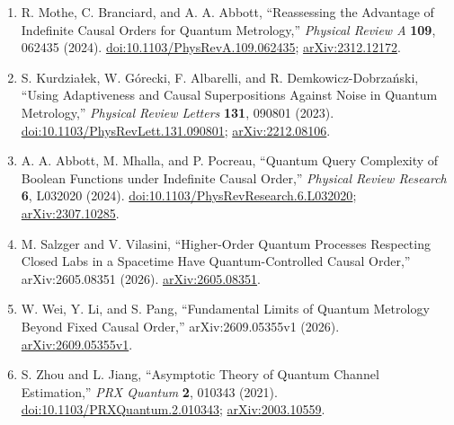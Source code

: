 \begin{enumerate}[label={},leftmargin=4.8em,labelsep=0.5em]
  \footnotesize
  \item[\textup{[MBA24]}]\label{ref:p61-mothe}
  R. Mothe, C. Branciard, and A. A. Abbott,
  ``Reassessing the Advantage of Indefinite Causal Orders for Quantum
  Metrology,'' \emph{Physical Review A} \textbf{109}, 062435 (2024).
  \href{https://doi.org/10.1103/PhysRevA.109.062435}{doi:10.1103/PhysRevA.109.062435};
  \href{https://arxiv.org/abs/2312.12172}{arXiv:2312.12172}.

  \item[\textup{[KGAD23]}]\label{ref:p61-kurdzialek}
  S. Kurdzia\l ek, W. G\'orecki, F. Albarelli, and
  R. Demkowicz-Dobrza\'nski,
  ``Using Adaptiveness and Causal Superpositions Against Noise in Quantum
  Metrology,'' \emph{Physical Review Letters} \textbf{131}, 090801 (2023).
  \href{https://doi.org/10.1103/PhysRevLett.131.090801}{doi:10.1103/PhysRevLett.131.090801};
  \href{https://arxiv.org/abs/2212.08106}{arXiv:2212.08106}.

  \item[\textup{[AMP24]}]\label{ref:p61-abbott}
  A. A. Abbott, M. Mhalla, and P. Pocreau,
  ``Quantum Query Complexity of Boolean Functions under Indefinite Causal
  Order,'' \emph{Physical Review Research} \textbf{6}, L032020 (2024).
  \href{https://doi.org/10.1103/PhysRevResearch.6.L032020}{doi:10.1103/PhysRevResearch.6.L032020};
  \href{https://arxiv.org/abs/2307.10285}{arXiv:2307.10285}.

  \item[\textup{[SV26]}]\label{ref:p61-salzger}
  M. Salzger and V. Vilasini,
  ``Higher-Order Quantum Processes Respecting Closed Labs in a Spacetime
  Have Quantum-Controlled Causal Order,'' arXiv:2605.08351 (2026).
  \href{https://arxiv.org/abs/2605.08351}{arXiv:2605.08351}.

  \item[\textup{[WLP26]}]\label{ref:p61-wei}
  W. Wei, Y. Li, and S. Pang,
  ``Fundamental Limits of Quantum Metrology Beyond Fixed Causal Order,''
  arXiv:2609.05355v1 (2026).
  \href{https://arxiv.org/abs/2609.05355v1}{arXiv:2609.05355v1}.

  \item[\textup{[ZJ21]}]\label{ref:p61-zhou}
  S. Zhou and L. Jiang,
  ``Asymptotic Theory of Quantum Channel Estimation,''
  \emph{PRX Quantum} \textbf{2}, 010343 (2021).
  \href{https://doi.org/10.1103/PRXQuantum.2.010343}{doi:10.1103/PRXQuantum.2.010343};
  \href{https://arxiv.org/abs/2003.10559}{arXiv:2003.10559}.
\end{enumerate}


